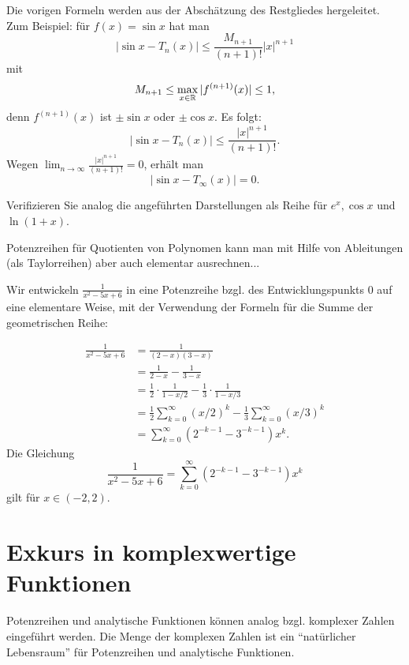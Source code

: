 \begin{bem} 
	Die vorigen Formeln werden aus der Abschätzung des Restgliedes hergeleitet. Zum Beispiel: für $f(x) = \sin x$ hat man 
	\[
		| \sin x - T_n(x) | \le \frac{ M_{n+1}}{(n+1)!} |x|^{n+1}
	\]
	mit 
	\[
		M_{n+1} \le \max_{x \in \mathbb{R}} |f^{(n+1)}(x)| \le 1,
	\]
	denn $f^{(n+1)}(x)$ ist $\pm \sin x$ oder $\pm \cos x$. 
	Es folgt: 
	\[
		| \sin x - T_n(x) | \le \frac{|x|^{n+1}}{(n+1)!}. 
	\]
	Wegen $\lim_{n \to \infty} \frac{|x|^{n+1}}{(n+1)!} = 0$, erhält man 
	\[
		| \sin x - T_\infty(x)| = 0. 
	\]
\end{bem} 

\begin{aufg}
	Verifizieren Sie analog die angeführten Darstellungen als Reihe für $e^x, \cos x$ und $\ln (1+x)$. 
\end{aufg} 

\begin{bem} 
		Potenzreihen für Quotienten von Polynomen kann man mit Hilfe von Ableitungen (als Taylorreihen) aber auch elementar ausrechnen...
\end{bem} 

\begin{bsp} 
Wir entwickeln $\frac{1}{x^2 - 5 x + 6}$ in eine Potenzreihe bzgl. des Entwicklungspunkts $0$ auf eine elementare Weise, mit der Verwendung der Formeln für die Summe der geometrischen Reihe: 
	
	\begin{align*} 
			\frac{1}{x^2 - 5 x + 6}  & 
			= \frac{1}{ (2-x) (3-x) }  
			\\ & = \frac{1}{2-x} - \frac{1}{3-x} 
			\\ & = \frac{1}{2} \cdot \frac{1}{1 - x/2} - \frac{1}{3} \cdot \frac{1}{1- x/3} 
			\\ & = \frac{1}{2} \sum_{k=0}^\infty (x/2)^k - \frac{1}{3} \sum_{k=0}^\infty (x/3)^k
			\\ & = \sum_{k=0}^\infty (2^{-k-1} - 3^{-k-1}) x^k. 
	\end{align*}
	Die Gleichung 
	\[
		\frac{1}{x^2 - 5 x + 6} = \sum_{k=0}^\infty (2^{-k-1} - 3^{-k-1}) x^k
	\]
	gilt für $x \in (-2,2)$. 
\end{bsp} 

\section{Exkurs in komplexwertige  Funktionen} 

\begin{bem} 
	Potenzreihen und analytische Funktionen können analog bzgl. komplexer Zahlen eingeführt werden. Die Menge der komplexen Zahlen ist ein ``natürlicher Lebensraum'' für Potenzreihen und analytische Funktionen. 
\end{bem} 

